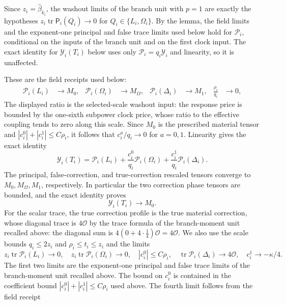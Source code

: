Since $z_i=\widehat\beta_{k_i}$, the washout limits of the branch unit
with $p=1$ are exactly the hypotheses
$z_i\operatorname{tr}\mathsf P_i(Q_i)\to0$ for $Q_i\in\{L_i,\Omega_i\}$.
By the lemma, the field limits and the exponent-one principal and false
trace limits used below hold for $\mathcal P_i$, conditional on the
inputs of the branch unit and on the first clock input. The exact
identity for $\mathcal Y_i(T_i)$ below uses only
$\mathcal P_i=q_i\mathcal Y_i$ and linearity, so it is unaffected.

These are the field receipts used below:
\begin{align}
 \mathcal P_i(L_i)&\longrightarrow M_0,&
 \mathcal P_i(\Omega_i)&\longrightarrow M_\Omega,&
 \mathcal P_i(\Delta_i)&\longrightarrow M_1,
 &\frac{\rho_i}{q_i}&\longrightarrow0,
 \label{eq:ex-lattice-scribe-field-receipts}
\end{align}
The displayed ratio is the selected-scale washout input: the response price
is bounded by the one-sixth subpower clock price, whose ratio to the effective
coupling tends to zero along this scale. Since $M_0$ is the prescribed
material tensor and $|c_i^0|+|c_i^1|\le C\rho_i$, it follows that
$c_i^a/q_i\to0$ for $a=0,1$. Linearity gives
the exact identity
\[
 \mathcal Y_i(T_i)=\mathcal P_i(L_i)
   +\frac{c_i^0}{q_i}\mathcal P_i(\Omega_i)
   +\frac{c_i^1}{q_i}\mathcal P_i(\Delta_i).
\]
The principal, false-correction, and true-correction rescaled tensors converge
to $M_0,M_\Omega,M_1$, respectively.
In particular the two correction phase tensors are bounded, and the exact
identity proves
\begin{equation}
 \mathcal Y_i(T_i)\longrightarrow M_0.
 \label{eq:ex-lattice-scribe-field-limit}
\end{equation}
For the scalar trace, the true correction profile is the true material
correction, whose diagonal trace is $4\mathcal O$ by the trace formula of
the branch-moment unit recalled above: the diagonal sum is
$4(0+4\cdot\frac14)\mathcal O=4\mathcal O$. We also use the scale bounds
$q_i\le2z_i$ and $\rho_i\le t_i\le z_i$ and the limits
\[
 z_i\operatorname{tr}\mathcal P_i(L_i)\to0,\quad
 z_i\operatorname{tr}\mathcal P_i(\Omega_i)\to0,\quad
 |c_i^0|\le C\rho_i,\quad
 \operatorname{tr}\mathcal P_i(\Delta_i)\to4\mathcal O,
 \quad c_i^1\to-\kappa/4.
\]
The first two limits are the exponent-one principal and false trace limits
of the branch-moment unit recalled above. The bound on $c_i^0$ is contained
in the coefficient bound $|c_i^0|+|c_i^1|\le C\rho_i$ used above. The
fourth limit follows from the field receipt
